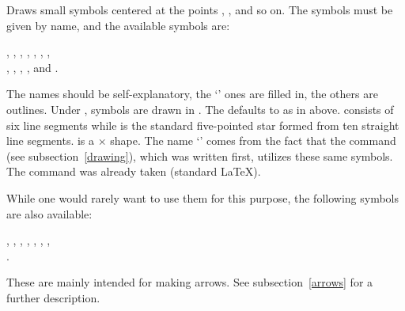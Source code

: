\documentclass[letterpaper]{article}
\begin{document}
\begin{cd}
%
%
\end{cd}

Draws small symbols centered at the points , ,
and so on. The symbols must be given by name, and the available symbols
are:
\begin{display}
,
,
,
,
,
,
,\\
,
,
,
,
 and
.
\end{display}
The names should be self-explanatory, the `' ones are filled
in, the others are outlines. Under , symbols are drawn in
. The  defaults to  as in
 above.  consists of six line segments while
 is the standard five-pointed star formed from ten straight
line segments.  is a $\times$ shape. The name
`' comes from the fact that the  command (see
subsection~\ref{drawing}), which was written first, utilizes these same
symbols. The command  was already taken (standard \LaTeX{}).

While one would rarely want to use them for this purpose, the following
symbols are also available:
\begin{display}
,
,
,
,
,
,
,\\
.
\end{display}
These are mainly intended for making arrows. See subsection~\ref{arrows}
for a further description.
\end{document}
